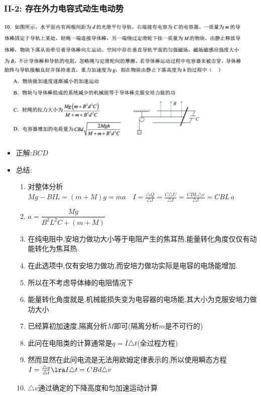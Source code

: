 \documentclass{article}
\begin{document}
\vspace{2em}

\subsubsection{II-2: 存在外力电容式动生电动势}
\includegraphics[width=0.95\textwidth,keepaspectratio]{./pictures/3.11-3.png}

\begin{itemize}
    \item 正解:\quad $BCD$
    \item 总结:\quad

          \hspace{2em}\begin{minipage}{0.88\textwidth}
              \begin{enumerate}[label = (\Alph*)]
                  \item 对整体分析$Mg - BIL = (m+M)g = ma \quad I = \frac{\triangle Q}{\triangle t}
                            = \frac{C \triangle U}{\triangle t} = \frac{C BL \triangle v}{\triangle t} = CBL \, a$

                  \item[] $a = \dfrac{Mg}{B^{2}L^{2}C + (m+M)} $
                  \item 在纯电阻中,安培力做功大小等于电阻产生的焦耳热,能量转化角度仅仅有动能转化为焦耳热.
                  \item[] 在此选项中,仅有安培力做功,而安培力做功实际是电容的电场能增加.
                  \item[] 所以在不考虑导体棒的电阻情况下
                  \item[] 能量转化角度就是,机械能损失变为电容器的电场能,其大小为克服安培力做功大小
                  \item 已经算初加速度,隔离分析$M$即可(隔离分析$m$是不可行的)
                  \item 此问在电阻类的计算通常是$q = \overline{I} \triangle t$(全过程方程)
                  \item[] 然而显然在此问电流是无法用欧姆定律表示的,所以使用瞬态方程
                      $I = \frac{\triangle q}{\triangle t} \lra I \triangle t = CBd \triangle v$
                  \item[] $\triangle v$通过确定的下降高度和匀加速运动计算
              \end{enumerate}
          \end{minipage}
\end{itemize}
\end{document}
